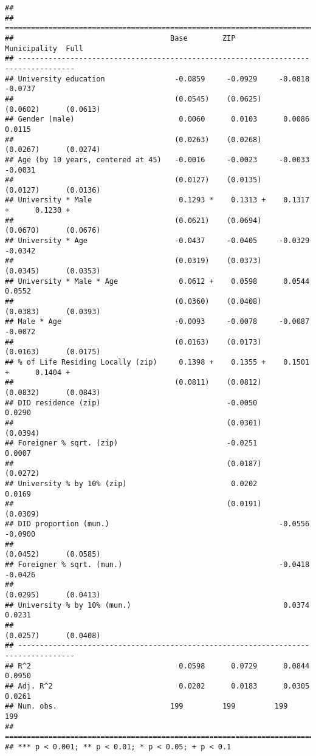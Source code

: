 \documentclass[
]{article}
\begin{document}
\begin{verbatim}
## 
## ===================================================================================
##                                    Base        ZIP         Municipality  Full      
## -----------------------------------------------------------------------------------
## University education                -0.0859     -0.0929     -0.0818       -0.0737  
##                                     (0.0545)    (0.0625)    (0.0602)      (0.0613) 
## Gender (male)                        0.0060      0.0103      0.0086        0.0115  
##                                     (0.0263)    (0.0268)    (0.0267)      (0.0274) 
## Age (by 10 years, centered at 45)   -0.0016     -0.0023     -0.0033       -0.0031  
##                                     (0.0127)    (0.0135)    (0.0127)      (0.0136) 
## University * Male                    0.1293 *    0.1313 +    0.1317 +      0.1230 +
##                                     (0.0621)    (0.0694)    (0.0670)      (0.0676) 
## University * Age                    -0.0437     -0.0405     -0.0329       -0.0342  
##                                     (0.0319)    (0.0373)    (0.0345)      (0.0353) 
## University * Male * Age              0.0612 +    0.0598      0.0544        0.0552  
##                                     (0.0360)    (0.0408)    (0.0383)      (0.0393) 
## Male * Age                          -0.0093     -0.0078     -0.0087       -0.0072  
##                                     (0.0163)    (0.0173)    (0.0163)      (0.0175) 
## % of Life Residing Locally (zip)     0.1398 +    0.1355 +    0.1501 +      0.1404 +
##                                     (0.0811)    (0.0812)    (0.0832)      (0.0843) 
## DID residence (zip)                             -0.0050                    0.0290  
##                                                 (0.0301)                  (0.0394) 
## Foreigner % sqrt. (zip)                         -0.0251                    0.0007  
##                                                 (0.0187)                  (0.0272) 
## University % by 10% (zip)                        0.0202                    0.0169  
##                                                 (0.0191)                  (0.0309) 
## DID proportion (mun.)                                       -0.0556       -0.0900  
##                                                             (0.0452)      (0.0585) 
## Foreigner % sqrt. (mun.)                                    -0.0418       -0.0426  
##                                                             (0.0295)      (0.0413) 
## University % by 10% (mun.)                                   0.0374        0.0231  
##                                                             (0.0257)      (0.0408) 
## -----------------------------------------------------------------------------------
## R^2                                  0.0598      0.0729      0.0844        0.0950  
## Adj. R^2                             0.0202      0.0183      0.0305        0.0261  
## Num. obs.                          199         199         199           199       
## ===================================================================================
## *** p < 0.001; ** p < 0.01; * p < 0.05; + p < 0.1
\end{verbatim}
\end{document}
